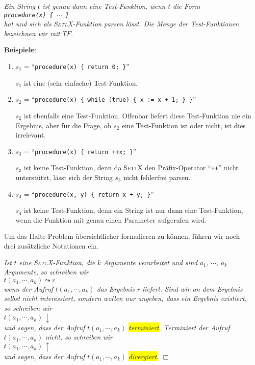 \begin{Definition} 
{\em Ein String $t$ ist genau dann eine \emph{Test-Funktion}, wenn $t$ 
 die Form \\[0.3cm]
\hspace*{1.3cm} {\tt procedure(x) \{ $\cdots$ \}} \\[0.3cm]
hat und sich als \textsc{SetlX}-Funktion parsen l\"{a}sst.  Die Menge der
Test-Funktionen bezeichnen wir mit $T\!F$.}  \eox
\end{Definition}

\noindent
\textbf{Beispiele}:  
\begin{enumerate}
\item $s_1$ = ``{\tt procedure(x) \{ return 0; \}}''

      $s_1$ ist eine (sehr einfache) Test-Funktion.
\item $s_2$ = ``{\tt procedure(x) \{ while (true) \{ x := x + 1; \} \}}''

      $s_2$ ist ebenfalls eine Test-Funktion.  Offenbar liefert diese Test-Funktion nie ein
      Ergebnis, aber f\"{u}r die Frage, ob $s_2$ eine Test-Funktion ist oder nicht, ist dies
      irrelevant.
\item $s_3$ = ``{\tt procedure(x) \{ return ++x; \}}''

      $s_3$ ist keine Test-Funktion, denn da \textsc{SetlX} den Pr\"{a}fix-Operator
      ``\texttt{++}'' nicht unterst\"{u}tzt, l\"{a}sst sich der String $s_3$  nicht fehlerfrei parsen.
\item $s_4$ = ``{\tt procedure(x, y) \{ return x + y; \}}''

      $s_4$ ist keine Test-Funktion, denn ein String ist nur dann eine Test-Funktion, wenn die Funktion
      mit genau einen Parameter aufgerufen wird.
\end{enumerate}
Um das Halte-Problem \"{u}bersichtlicher formulieren zu k\"{o}nnen, f\"{u}hren wir noch drei
zus\"{a}tzliche Notationen ein.
\begin{Notation}[$\leadsto$, $\downarrow$, $\uparrow$]
{\em
Ist $t$ eine \textsc{SetlX}-Funktion, die $k$ Argumente verarbeitet und sind $a_1$, $\cdots$, $a_k$ Argumente,
so schreiben wir \\[0.3cm]
\hspace*{1.3cm} $t(a_1, \cdots, a_k) \leadsto r$ \\[0.3cm]
wenn der Aufruf $t(a_1, \cdots, a_k)$ das Ergebnis $r$ liefert.  Sind wir an dem Ergebnis
selbst nicht interessiert, sondern wollen nur angeben, dass ein Ergebnis existiert, so
schreiben wir \\[0.3cm]
\hspace*{1.3cm} $t(a_1, \cdots, a_k) \,\downarrow$ \\[0.3cm]
und sagen, dass der Aufruf $t(a_1, \cdots, a_k)$ \colorbox{yellow}{\emph{terminiert}}.
Terminiert der Aufruf $t(a_1, \cdots, a_k)$ nicht, so schreiben wir \\[0.3cm]
\hspace*{1.3cm} $t(a_1, \cdots, a_k) \,\uparrow$ \\[0.3cm]
und sagen, dass der Aufruf $t(a_1, \cdots, a_k)$ \colorbox{yellow}{\emph{divergiert}}.
\hspace*{\fill} $\Box$
}
\end{Notation}

